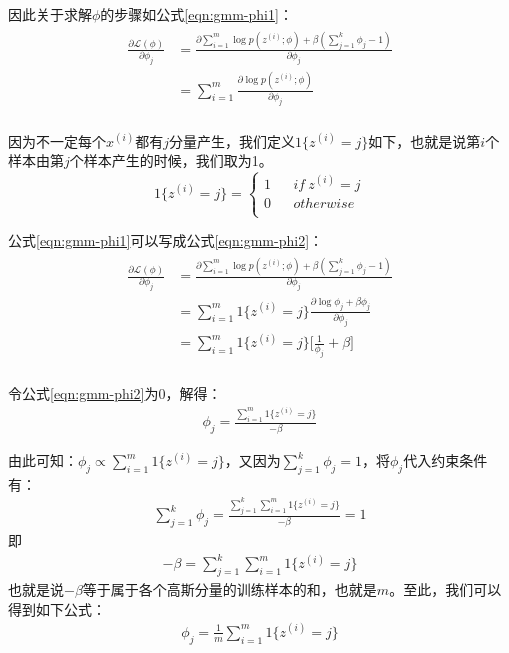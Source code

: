 因此关于求解$\phi$的步骤如公式\ref{eqn:gmm-phi1}：
\begin{align}
\label{eqn:gmm-phi1}
\begin{split}
  \frac{\partial \mathcal{L}(\phi)}{\partial \phi_j}
  &=\frac{\partial \sum_{i=1}^{m} \log p(z^{(i)};\phi) + \beta(\sum_{j=1}^{k} \phi_{j}-1)}{\partial \phi_j} \\
  &= \sum_{i=1}^{m} \frac{\partial \log p(z^{(i)};\phi)}{\partial \phi_j} \\
\end{split}
\end{align}

因为不一定每个$x^{(i)}$都有$j$分量产生，我们定义$1\{z^{(i)}=j\}$如下，也就是说第$i$个样本由第$j$个样本产生的时候，我们取为1。
\begin{equation}
1\{z^{(i)}=j\}=\left\{
\begin{array}{rcl}
1& & if \  z^{(i)}=j\\
0 & & otherwise\\
\end{array} \right.
\end{equation}

公式\ref{eqn:gmm-phi1}可以写成公式\ref{eqn:gmm-phi2}：
\begin{align}
\label{eqn:gmm-phi2}
\begin{split}
  \frac{\partial \mathcal{L}(\phi)}{\partial \phi_j}
  &=\frac{\partial \sum_{i=1}^{m} \log p(z^{(i)};\phi) + \beta(\sum_{j=1}^{k} \phi_{j}-1)}{\partial \phi_j} \\
  &= \sum_{i=1}^{m} 1\{z^{(i)}=j\} \frac{\partial \log \phi_j + \beta{\phi_{j}}}{\partial \phi_j} \\
  &= \sum_{i=1}^{m} 1\{z^{(i)}=j\} \Big[ \frac{1}{\phi_j} + \beta \Big]\\
\end{split}
\end{align}

令公式\ref{eqn:gmm-phi2}为0，解得：
\begin{align}
  \phi_j = \frac{\sum_{i=1}^{m} 1\{z^{(i)}=j\}}{-\beta}
\end{align}

由此可知：$\phi_j \propto \sum_{i=1}^{m} 1\{z^{(i)}=j\}$，又因为$\sum_{j=1}^{k} \phi_{j}=1$，将$\phi_j$代入约束条件有：
\begin{align}
  \sum_{j=1}^{k} \phi_j = \frac{ \sum_{j=1}^{k} \sum_{i=1}^{m} 1\{z^{(i)}=j\}}{-\beta} =1
\end{align}
即
\begin{align}
  -\beta = \sum_{j=1}^{k} \sum_{i=1}^{m} 1\{z^{(i)}=j\}
\end{align}
也就是说$-\beta$等于属于各个高斯分量的训练样本的和，也就是$m$。至此，我们可以得到如下公式：
\begin{align}
  \phi_j = \frac{1}{m}\sum_{i=1}^{m} 1\{z^{(i)}=j\}
\end{align}

